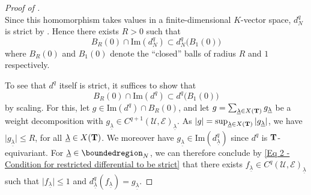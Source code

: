 \documentclass[a4paper, reqno, 10pt]{amsart}
\theoremstyle{definition}
\numberwithin{equation}{section}
\newcommand{\abs}[1]{{\lvert{#1}\rvert}}
\renewcommand{\Im}{{\mathrm{Im}}}
\newcommand{\ul}[1]{{\underline{#1}}}
\newcommand{\CE}{{\mathcal {E}}}
\newcommand{\CU}{{\mathcal {U}}}
\newcommand{\bT}{{\mathrm{\bf T}}}
\begin{document}
\begin{proof}[{Proof of }]
\begin{equation*}
	\end{equation*}
	Since this homomorphism takes values in a finite-dimensional $K$-vector space, $d^q_N$ is strict by \cite[I.2.3. Cor.]{Bourbaki87TopVectSp1to5}.
	Hence there exists $R>0$ such that
	\begin{equation}\label{Eq 2 - Condition for restricted differential to be strict}
		B_R(0) \cap \Im(d^q_N) \subset d_N^q \big( B_1(0)\big)
	\end{equation}
	where $B_{R}(0)$ and $B_1(0)$ denote the ``closed'' balls of radius $R$ and $1$ respectively.
	
	
	To see that $d^q$ itself is strict, it suffices to show that
	\begin{equation}\label{Eq 2 - Condition for differential to be strict}
		B_R(0) \cap \Im(d^q) \subset d^q \big( B_1(0) \big) 
	\end{equation}
	by scaling.
	For this, let $g \in \Im(d^q) \cap B_R(0)$, and let $g= \sum_{\ul{\lambda}\in X(\bT)} g_\ul{\lambda}$ be a weight decomposition with $g_\ul{\lambda} \in C^{q+1}(\CU,\CE)_\ul{\lambda}$.
	As $\abs{g} = \sup_{\ul{\lambda}\in X(\bT)} \abs{ g_\ul{\lambda}}$, we have $\abs{g_\ul{\lambda}} \leq R$, for all $\ul{\lambda}\in X(\bT)$.
	We moreover have $g_\ul{\lambda}\in \Im(d^q_\ul{\lambda})$ since $d^q$ is $\bT$-equivariant.
	For $\ul{\lambda}\in \boundedregion_N$, we can therefore conclude by \eqref{Eq 2 - Condition for restricted differential to be strict} that there exists $f_\ul{\lambda} \in C^q(\CU,\CE)_\ul{\lambda}$ such that $\abs{f_\ul{\lambda}} \leq 1$ and $d^q_\ul{\lambda} (f_\ul{\lambda}) = g_\ul{\lambda}$.
	

\end{proof}
\end{document}
